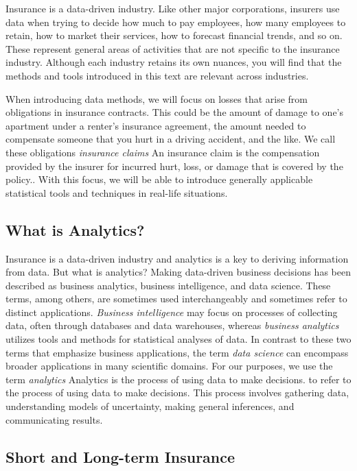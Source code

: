 \documentclass[]{book}
\theoremstyle{definition}
\theoremstyle{definition}
\theoremstyle{definition}
\theoremstyle{remark}
\begin{document}
Insurance is a data-driven industry. Like other major corporations,
insurers use data when trying to decide how much to pay employees, how
many employees to retain, how to market their services, how to forecast
financial trends, and so on. These represent general areas of activities
that are not specific to the insurance industry. Although each industry
retains its own nuances, you will find that the methods and tools
introduced in this text are relevant across industries.

When introducing data methods, we will focus on losses that arise from
obligations in insurance contracts. This could be the amount of damage
to one's apartment under a renter's insurance agreement, the amount
needed to compensate someone that you hurt in a driving accident, and
the like. We call these obligations \emph{insurance claims}{ An
insurance claim is the compensation provided by the insurer for incurred
hurt, loss, or damage that is covered by the policy.}. With this focus,
we will be able to introduce generally applicable statistical tools and
techniques in real-life situations.

\subsection{What is Analytics?}\label{what-is-analytics}

Insurance is a data-driven industry and analytics is a key to deriving
information from data. But what is analytics? Making data-driven
business decisions has been described as business analytics, business
intelligence, and data science. These terms, among others, are sometimes
used interchangeably and sometimes refer to distinct applications.
\emph{Business intelligence} may focus on processes of collecting data,
often through databases and data warehouses, whereas \emph{business
analytics} utilizes tools and methods for statistical analyses of data.
In contrast to these two terms that emphasize business applications, the
term \emph{data science} can encompass broader applications in many
scientific domains. For our purposes, we use the term \emph{analytics}{
Analytics is the process of using data to make decisions.} to refer to
the process of using data to make decisions. This process involves
gathering data, understanding models of uncertainty, making general
inferences, and communicating results.

\subsection{Short and Long-term
Insurance}\label{short-and-long-term-insurance}
\end{document}
